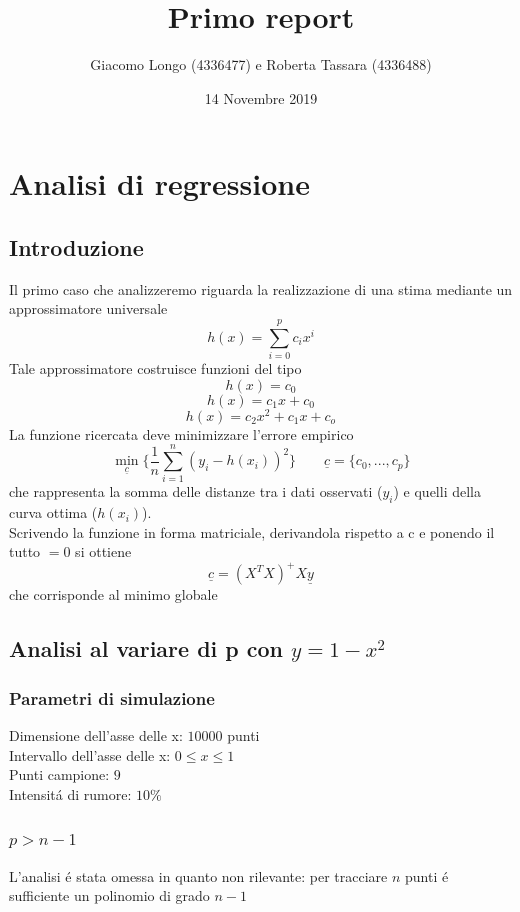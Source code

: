 \documentclass[12pt]{article}
\title{Primo report}
\author{Giacomo Longo (4336477) e Roberta Tassara (4336488)}
\date{14 Novembre 2019}
\begin{document}
\begin{titlepage}
\maketitle
\end{titlepage}

\section{Analisi di regressione}
\subsection{Introduzione}
Il primo caso che analizzeremo riguarda la realizzazione di una stima mediante un approssimatore universale
$$
  h(x) = \sum_{i=0}^{p} c_i x^i
$$
Tale approssimatore costruisce funzioni del tipo
$$
  h(x) = c_0
$$
$$
  h(x) = c_1 x + c_0
$$
$$
  h(x) = c_2 x^2 + c_1 x + c_o
$$
La funzione ricercata deve minimizzare l'errore empirico
$$
  \underset{\underline{c}}{\min} \{ \frac{1}{n} \sum_{i=1}^{n} (y_i - h(x_i))^2 \}
  \qquad
  \underline{c} = \{ c_0, ..., c_p \}
$$
che rappresenta la somma delle distanze tra i dati osservati ($y_i$) e quelli della curva ottima ($h(x_i)$). \\
Scrivendo la funzione in forma matriciale,
derivandola rispetto a c
e ponendo il tutto $=0$ si ottiene
$$
  \underline{c} = (X^T X)^+ X \underline{y}
$$
che corrisponde al minimo globale

\subsection{Analisi al variare di p con $y=1-x^2$}

\subsubsection{Parametri di simulazione}
Dimensione dell'asse delle x: $10000$ punti \\
Intervallo dell'asse delle x: $0 \leq x \leq 1$ \\
Punti campione: $9$ \\
Intensitá di rumore: $10\%$

\subsubsection{$p>n-1$}
L'analisi é stata omessa in quanto non rilevante: per tracciare $n$ punti é sufficiente un polinomio di grado $n-1$
\end{document}
